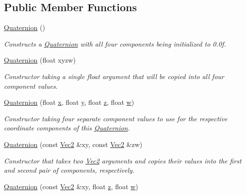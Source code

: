\subsection*{Public Member Functions}
\begin{DoxyCompactItemize}
\item 
\hyperlink{classgfxmath_1_1_quaternion_a46f549f23e8bd1032697e3febcff7fe5}{Quaternion} ()
\begin{DoxyCompactList}\small\item\em Constructs a \hyperlink{classgfxmath_1_1_quaternion}{Quaternion} with all four components being initialized to 0.\+0f. \end{DoxyCompactList}\item 
\hyperlink{classgfxmath_1_1_quaternion_ac8a094f33b02273387afa1beeabb9034}{Quaternion} (float xyzw)
\begin{DoxyCompactList}\small\item\em Constructor taking a single float argument that will be copied into all four component values. \end{DoxyCompactList}\item 
\hyperlink{classgfxmath_1_1_quaternion_a8b19546f4e4a48a3784b80b0fd8208d9}{Quaternion} (float \hyperlink{classgfxmath_1_1_vec4_a273598aff75406f0e7a47121b8b06037}{x}, float \hyperlink{classgfxmath_1_1_vec4_a95e0ca27d66d7e0223606c20d326b595}{y}, float \hyperlink{classgfxmath_1_1_vec4_acd626b757468a5ea39f98812a36c4419}{z}, float \hyperlink{classgfxmath_1_1_vec4_adf2769a47b464dfee8d04e191f21701e}{w})
\begin{DoxyCompactList}\small\item\em Constructor taking four separate component values to use for the respective coordinate components of this \hyperlink{classgfxmath_1_1_quaternion}{Quaternion}. \end{DoxyCompactList}\item 
\hyperlink{classgfxmath_1_1_quaternion_a4034b6d18b58b65ecf329531d78317db}{Quaternion} (const \hyperlink{classgfxmath_1_1_vec2}{Vec2} \&xy, const \hyperlink{classgfxmath_1_1_vec2}{Vec2} \&zw)
\begin{DoxyCompactList}\small\item\em Constructor that takes two \hyperlink{classgfxmath_1_1_vec2}{Vec2} arguments and copies their values into the first and second pair of components, respectively. \end{DoxyCompactList}\item 
\hyperlink{classgfxmath_1_1_quaternion_a3ae6c4d2f305a7d89f517fdab000152b}{Quaternion} (const \hyperlink{classgfxmath_1_1_vec2}{Vec2} \&xy, float \hyperlink{classgfxmath_1_1_vec4_acd626b757468a5ea39f98812a36c4419}{z}, float \hyperlink{classgfxmath_1_1_vec4_adf2769a47b464dfee8d04e191f21701e}{w})

\end{DoxyCompactItemize}

